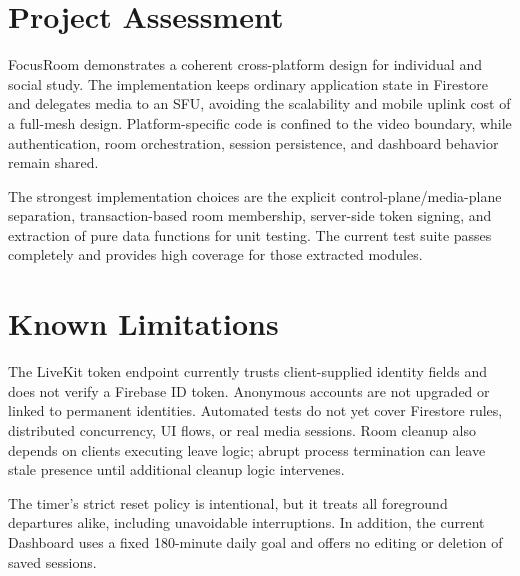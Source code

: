 \section{Project Assessment}
FocusRoom demonstrates a coherent cross-platform design for individual and social study. The implementation keeps ordinary application state in Firestore and delegates media to an SFU, avoiding the scalability and mobile uplink cost of a full-mesh design. Platform-specific code is confined to the video boundary, while authentication, room orchestration, session persistence, and dashboard behavior remain shared.

The strongest implementation choices are the explicit control-plane/media-plane separation, transaction-based room membership, server-side token signing, and extraction of pure data functions for unit testing. The current test suite passes completely and provides high coverage for those extracted modules.

\section{Known Limitations}
The LiveKit token endpoint currently trusts client-supplied identity fields and does not verify a Firebase ID token. Anonymous accounts are not upgraded or linked to permanent identities. Automated tests do not yet cover Firestore rules, distributed concurrency, UI flows, or real media sessions. Room cleanup also depends on clients executing leave logic; abrupt process termination can leave stale presence until additional cleanup logic intervenes.

The timer's strict reset policy is intentional, but it treats all foreground departures alike, including unavoidable interruptions. In addition, the current Dashboard uses a fixed 180-minute daily goal and offers no editing or deletion of saved sessions.


